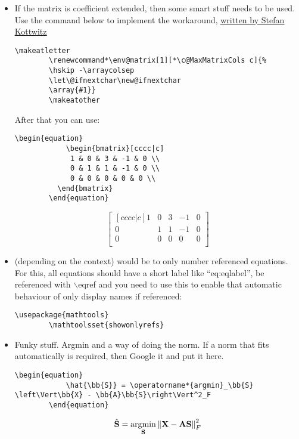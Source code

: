 \begin{itemize}
    \item If the matrix is coefficient extended, then some smart stuff needs to be used. Use the command below to implement the workaround, \href{http://texblog.net/latex-archive/maths/amsmath-matrix/}{\ul{written by Stefan Kottwitz}}
    \begin{lstlisting}[language = Tex, numbers = none]
        \makeatletter
        \renewcommand*\env@matrix[1][*\c@MaxMatrixCols c]{%
        \hskip -\arraycolsep
        \let\@ifnextchar\new@ifnextchar
        \array{#1}}
        \makeatother
    \end{lstlisting}
    After that you can use:
    \begin{lstlisting}[language = Tex, numbers = none]
        \begin{equation}
            \begin{bmatrix}[cccc|c]
             1 & 0 & 3 & -1 & 0 \\
             0 & 1 & 1 & -1 & 0 \\
             0 & 0 & 0 & 0 & 0 \\
          \end{bmatrix}
        \end{equation}
    \end{lstlisting}
    \begin{equation}
        \begin{bmatrix}[cccc|c]
         1 & 0 & 3 & -1 & 0 \\
         0 & 1 & 1 & -1 & 0 \\
         0 & 0 & 0 & 0 & 0 \\
        \end{bmatrix}
    \end{equation}
    \item {} (depending on the context) would be to only number referenced equations. For this, all equations should have a short label like ``eq:eqlabel'', be referenced with $\backslash$eqref and you need to use this to enable that automatic behaviour of only display names if referenced:
    \begin{lstlisting}[language = Tex, numbers = none]
        \usepackage{mathtools}
        \mathtoolsset{showonlyrefs}
    \end{lstlisting}
    \item Funky stuff. Argmin and a way of doing the norm. If a norm that fits automatically is required, then Google it and put it  here.
    \begin{lstlisting}[language = Tex, numbers = none]
        \begin{equation}
            \hat{\bb{S}} = \operatorname*{argmin}_\bb{S} \left\Vert\bb{X} - \bb{A}\bb{S}\right\Vert^2_F
        \end{equation}
    \end{lstlisting}
    \begin{equation}
        \hat{\textbf{S}} = \operatorname*{argmin}_{\textbf{S}} \left\Vert\textbf{X} - \textbf{A}\textbf{S}\right\Vert^2_F
    \end{equation}
\end{itemize}




